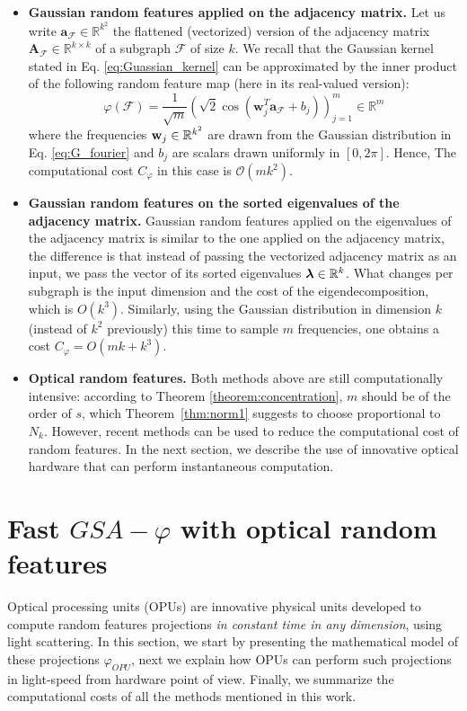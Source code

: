 \begin{itemize}
\item \textbf{Gaussian random features applied on the adjacency matrix.} Let us write $\mathbf{a}_\mathcal{F}\in\mathbb{R}^{k^2}$ the flattened (vectorized) version of the adjacency matrix $\mathbf{A}_\mathcal{F}\in\mathbb{R}^{k\times k}$ of a subgraph $\mathcal{F}$ of size $k$. We recall that the Gaussian kernel stated in Eq. \ref{eq:Guassian_kernel} can be approximated by the inner product of the following random feature map (here in its real-valued version):
\[
\varphi(\mathcal{F}) = \frac{1}{\sqrt{m}} \left( \sqrt{2} \cos(\mathbf{w}_j^T\mathbf{a}_\mathcal{F}+b_j) \right)_{j=1}^m \in \mathbb{R}^m
\]
where the frequencies $\mathbf{w}_j\in\mathbb{R}^{k^2}$ are drawn from the Gaussian distribution in Eq. \ref{eq:G_fourier} and $b_j$ are scalars drawn uniformly in $[0, 2\pi]$. Hence, The computational cost $C_\varphi$ in this case is $\mathcal{O}(mk^2)$.

\item \textbf{Gaussian random features on the sorted eigenvalues of the adjacency matrix.} Gaussian random features applied on the eigenvalues of the adjacency matrix is similar to the one applied on the adjacency matrix, the difference is that instead of passing the vectorized adjacency matrix as an input, we pass the  vector of its sorted eigenvalues $\bm{\lambda}\in\mathbb{R}^k$. What changes per subgraph is the input dimension and the cost of the eigendecomposition, which is $O(k^3)$. Similarly, using the Gaussian distribution in dimension $k$ (instead of $k^2$ previously) this time to sample $m$ frequencies, one obtains a cost $C_{\varphi}=O(mk+k^3)$.

\item \textbf{Optical random features.} Both methods above are still computationally intensive: according to Theorem \ref{theorem:concentration}, $m$ should be of the order of $s$, which Theorem~\ref{thm:norm1} suggests to choose proportional to $N_k$. However, recent methods can be used to reduce the computational cost of random features. In the next section, we describe the use of innovative optical hardware that can perform instantaneous computation.
\end{itemize}


\section{Fast $GSA-\varphi$ with optical random features}
\label{section:OPU}
Optical processing units (OPUs) are innovative physical units developed to compute random features projections \emph{in constant time in any dimension}, using light scattering. In this section, %
we start by presenting the mathematical model of these projections $\varphi_{OPU}$, next we explain how OPUs can perform such projections in light-speed from hardware point of view. Finally, we summarize the computational costs of all the methods mentioned in this work.

